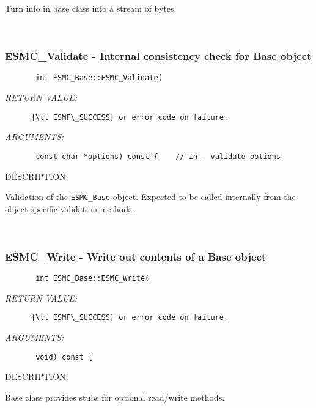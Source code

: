       Turn info in base class into a stream of bytes.
   
 
\mbox{}\hrulefill\
 
\subsubsection [ESMC\_Validate] {ESMC\_Validate - Internal consistency check for Base object}


  
\begin{verbatim}       int ESMC_Base::ESMC_Validate(\end{verbatim}{\em RETURN VALUE:}
\begin{verbatim}      {\tt ESMF\_SUCCESS} or error code on failure.\end{verbatim}{\em ARGUMENTS:}
\begin{verbatim}       const char *options) const {    // in - validate options\end{verbatim}
{\sf DESCRIPTION:\\ }


       Validation of the {\tt ESMC\_Base} object.  Expected to be called
       internally from the object-specific validation methods.
   
 
\mbox{}\hrulefill\ 
 
\subsubsection [ESMC\_Write] {ESMC\_Write - Write out contents of a Base object}


  
\begin{verbatim}       int ESMC_Base::ESMC_Write(\end{verbatim}{\em RETURN VALUE:}
\begin{verbatim}      {\tt ESMF\_SUCCESS} or error code on failure.\end{verbatim}{\em ARGUMENTS:}
\begin{verbatim}       void) const {\end{verbatim}
{\sf DESCRIPTION:\\ }


      Base class provides stubs for optional read/write methods.
   
